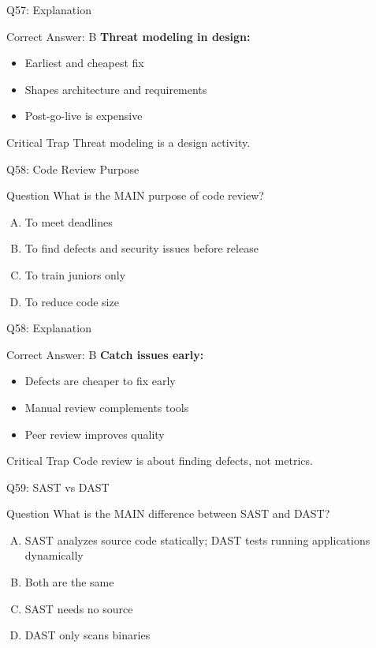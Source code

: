 \documentclass{beamer}
\begin{document}
	\begin{frame}{Q57: Explanation}
		\begin{block}{Correct Answer: B}
			\textbf{Threat modeling in design:}
			\begin{itemize}
				\item Earliest and cheapest fix
				\item Shapes architecture and requirements
				\item Post-go-live is expensive
			\end{itemize}
		\end{block}
		\begin{alertblock}{Critical Trap}
			Threat modeling is a design activity.
		\end{alertblock}
	\end{frame}
	
	\begin{frame}{Q58: Code Review Purpose}
		\begin{block}{Question}
			What is the MAIN purpose of code review?
		\end{block}
		\begin{enumerate}[(A)]
			\item To meet deadlines
			\item To find defects and security issues before release
			\item To train juniors only
			\item To reduce code size
		\end{enumerate}
	\end{frame}
	
	\begin{frame}{Q58: Explanation}
		\begin{block}{Correct Answer: B}
			\textbf{Catch issues early:}
			\begin{itemize}
				\item Defects are cheaper to fix early
				\item Manual review complements tools
				\item Peer review improves quality
			\end{itemize}
		\end{block}
		\begin{alertblock}{Critical Trap}
			Code review is about finding defects, not metrics.
		\end{alertblock}
	\end{frame}
	
	\begin{frame}{Q59: SAST vs DAST}
		\begin{block}{Question}
			What is the MAIN difference between SAST and DAST?
		\end{block}
		\begin{enumerate}[(A)]
			\item SAST analyzes source code statically; DAST tests running applications dynamically
			\item Both are the same
			\item SAST needs no source
			\item DAST only scans binaries
		\end{enumerate}
	\end{frame}
	
\end{document}
